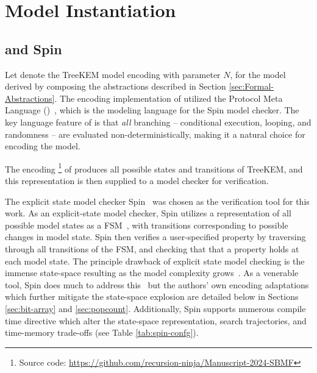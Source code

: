 \documentclass[runningheads]{llncs}
\newcommand{\Abrev}[1]{\gls{#1}}
\begin{document}
\section{Model Instantiation}

\subsection{\Promela and Spin}

\newcommand\dblwrr{\wr\mkern-2mu\wr}

Let  denote the TreeKEM model encoding with parameter $N$, for the model derived by composing the abstractions described in Section \ref{sec:Formal-Abstractions}.
The encoding implementation of  utilized the Protocol Meta Language (\Promela)~\cite{HolzmannSpinBook2003}, 
which is the modeling language for the Spin model checker. 
The key language feature of \Promela is that \emph{all} branching -- conditional execution, looping, and randomness -- are evaluated non-deterministically, making it a natural choice for encoding the model.

The \Promela encoding \footnote{Source code: \url{https://github.com/recursion-ninja/Manuscript-2024-SBMF}} of  produces all possible states and transitions of TreeKEM, and this representation is then supplied to a model checker for verification.


The explicit state model checker Spin~\cite{HolzmannSpinBook2003} was chosen as the verification tool for this work.
As an explicit-state model checker, Spin utilizes a representation of all possible model states as a \Abrev{FSM}~\cite{clarke1981design}, with transitions corresponding to possible changes in model state.
Spin then verifies a user-specified property by traversing through all transitions of the \Abrev{FSM}, and checking that that a property holds at each model state.
The principle drawback of explicit state model checking is the immense state-space resulting as the model complexity grows~\cite{burch1992symbolic}.
As a venerable tool, Spin does much to address this~\cite{rudin1987limits} but the authors' own encoding adaptations which further mitigate the state-space explosion are detailed below in Sections \ref{sec:bit-array} and \ref{sec:popcount}.
Additionally, Spin supports numerous compile time directive which alter the state-space representation, search trajectories, and time-memory trade-offs (see Table \ref{tab:spin-confg}).
\end{document}
